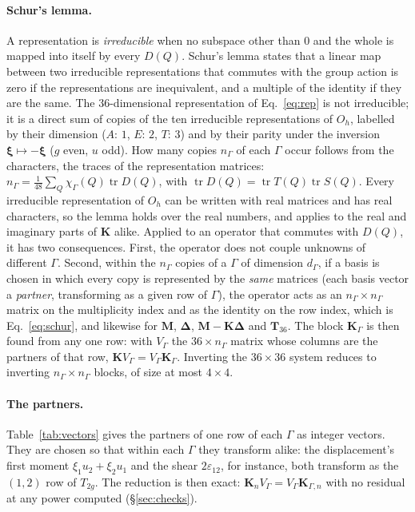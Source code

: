 \documentclass[11pt,a4paper]{article}
\newcommand{\bK}{\mathbf{K}}
\newcommand{\bM}{\mathbf{M}}
\newcommand{\bT}{\mathbf{T}}
\newcommand{\bD}{\boldsymbol{\Delta}}
\newcommand{\bxi}{\boldsymbol{\xi}}
\begin{document}
\paragraph{Schur's lemma.} A representation is \emph{irreducible} when no subspace other than $0$ and the
whole is mapped into itself by every $D(Q)$. Schur's lemma states that a linear map between two irreducible
representations that commutes with the group action is zero if the representations are inequivalent, and a
multiple of the identity if they are the same. The $36$-dimensional representation of Eq.~\eqref{eq:rep} is
not irreducible; it is a direct sum of copies of the ten irreducible representations of $O_h$, labelled by
their dimension ($A$: $1$, $E$: $2$, $T$: $3$) and by their parity under the inversion $\bxi\mapsto-\bxi$
($g$ even, $u$ odd). How many copies $n_\Gamma$ of each $\Gamma$ occur follows from the characters, the
traces of the representation matrices: $n_\Gamma=\tfrac1{48}\sum_Q\chi_\Gamma(Q)\operatorname{tr}D(Q)$, with
$\operatorname{tr}D(Q)=\operatorname{tr}T(Q)\operatorname{tr}S(Q)$. Every irreducible representation of $O_h$
can be written with real matrices and has real characters, so the lemma holds over the real numbers, and
applies to the real and imaginary parts of $\bK$ alike. Applied to an operator that commutes with $D(Q)$, it
has two consequences. First, the operator does not couple unknowns of different $\Gamma$. Second, within the
$n_\Gamma$ copies of a $\Gamma$ of dimension $d_\Gamma$, if a basis is chosen in which every copy is
represented by the \emph{same} matrices (each basis vector a \emph{partner}, transforming as a given row of
$\Gamma$), the operator acts as an $n_\Gamma\times n_\Gamma$ matrix on the multiplicity index and as the
identity on the row index, which is Eq.~\eqref{eq:schur}, and likewise for $\bM$, $\bD$, $\bM-\bK\bD$ and $\bT_{36}$. The block $\bK_\Gamma$ is then found from any one
row: with $V_\Gamma$ the $36\times n_\Gamma$ matrix whose columns are the partners of that row,
$\bK V_\Gamma=V_\Gamma\bK_\Gamma$. Inverting the $36\times36$ system reduces to inverting $n_\Gamma\times
n_\Gamma$ blocks, of size at most $4\times4$.

\paragraph{The partners.} Table~\ref{tab:vectors} gives the partners of one
row of each $\Gamma$ as integer vectors. They are chosen so that within each $\Gamma$ they transform alike:
the displacement's first moment $\xi_1u_2+\xi_2u_1$ and the shear $2\varepsilon_{12}$, for instance, both
transform as the $(1,2)$ row of $T_{2g}$. The reduction is then exact: $\bK_nV_\Gamma=V_\Gamma\bK_{\Gamma,n}$
with no residual at any power computed (\S\ref{sec:checks}).
\end{document}
